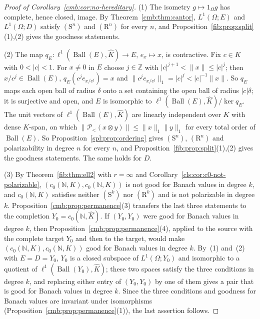 \documentclass[11pt]{amsart}
\theoremstyle{definition}
\theoremstyle{remark}
\numberwithin{equation}{section}
\newcommand{\N}{\mathbb N}
\newcommand{\Z}{\mathbb Z}
\newcommand{\abs}[1]{\lvert #1\rvert}
\newcommand{\norm}[1]{\lVert #1\rVert}
\newcommand{\Kh}{\widehat K}
\theoremstyle{plain}
\theoremstyle{definition}
\theoremstyle{plain}
\newcommand{\cP}{\mathcal P}
\begin{document}
\begin{proof}[Proof of Corollary~\ref{cmb:cor:no-hereditary}]
(1) The isometry $g\mapsto1_\Omega g$ has complete, hence closed, image. By Theorem~\ref{cmb:thm:cantor},
$L^1(\Omega;E)$ and $L^1(\Omega;D)$ satisfy $(\mathrm S^n)$ and $(\mathrm R^n)$ for every $n$, and
Proposition~\ref{fib:prop:split}(1),(2) gives the goodness statements.

(2) The map $q_E\colon\ell^1(\operatorname{Ball}(E),\Kh)\to E$, $e_x\mapsto x$, is contractive. Fix $c\in K$ with
$0<\abs c<1$. For $x\ne0$ in $E$ choose $j\in\Z$ with $\abs c^{j+1}<\norm x\le\abs c^j$; then $x/c^j\in\operatorname{Ball}(E)$,
$q_E(c^je_{x/c^j})=x$ and $\norm{c^je_{x/c^j}}_1=\abs c^j<\abs c^{-1}\norm x$. So $q_E$ maps each open ball of radius
$\delta$ onto a set containing the open ball of radius $\abs c\delta$; it is surjective and open, and $E$ is isomorphic to
$\ell^1(\operatorname{Ball}(E),\Kh)/\ker q_E$. The unit vectors of $\ell^1(\operatorname{Ball}(E),\Kh)$ are linearly
independent over $K$ with dense $K$-span, on which $\norm{\cP_<(x\otimes y)}\le\norm x_1\norm y_1$ for every total order
of $\operatorname{Ball}(E)$. So Proposition~\ref{spl:prop:ordering} gives $(\mathrm S^n)$, $(\mathrm R^n)$ and
polarizability in degree $n$ for every $n$, and Proposition~\ref{fib:prop:split}(1),(2) gives the goodness statements.
The same holds for $D$.

(3) By Theorem~\ref{fib:thm:ell2} with $r=\infty$ and Corollary~\ref{cls:cor:c0-not-polarizable},
$(c_0(\N,K),c_0(\N,K))$ is not good for Banach values in degree $k$, and $c_0(\N,K)$ satisfies neither $(\mathrm S^k)$ nor
$(\mathrm R^k)$ and is not polarizable in degree $k$. Proposition~\ref{cmb:prop:permanence}(3) transfers the last three
statements to the completion $Y_0=c_0(\N,\Kh)$. If $(Y_0,Y_0)$ were good for Banach values in degree $k$, then
Proposition~\ref{cmb:prop:permanence}(4), applied to the source with the complete target $Y_0$ and then to the target,
would make $(c_0(\N,K),c_0(\N,K))$ good for Banach values in degree $k$. By~(1) and~(2) with $E=D=Y_0$, $Y_0$ is a closed
subspace of $L^1(\Omega;Y_0)$ and isomorphic to a quotient of $\ell^1(\operatorname{Ball}(Y_0),\Kh)$; these two spaces
satisfy the three conditions in degree $k$, and replacing either entry of $(Y_0,Y_0)$ by one of them gives a pair that is
good for Banach values in degree $k$. Since the three conditions and goodness for Banach values are invariant under
isomorphisms (Proposition~\ref{cmb:prop:permanence}(1)), the last assertion follows.
\end{proof}
\end{document}
